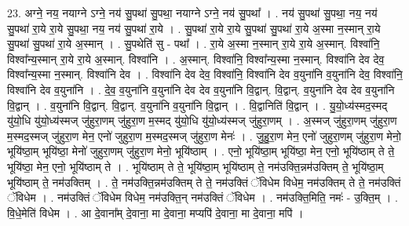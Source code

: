 \documentclass[17pt]{extarticle}
\begin{document}
23. अग्ने॒ नय॒ नयाग्ने ऽग्ने॒ नय॑ सु॒पथा॑ सु॒पथा॒ नयाग्ने ऽग्ने॒ नय॑ सु॒पथा᳚ । . नय॑ सु॒पथा॑ सु॒पथा॒ नय॒ नय॑ सु॒पथा॑ रा॒ये रा॒ये सु॒पथा॒ नय॒ नय॑ सु॒पथा॑ रा॒ये । . सु॒पथा॑ रा॒ये रा॒ये सु॒पथा॑ सु॒पथा॑ रा॒ये अ॒स्मा न॒स्मान् रा॒ये सु॒पथा॑ सु॒पथा॑ रा॒ये अ॒स्मान् । . सु॒पथेति॑ सु - पथा᳚ । . रा॒ये अ॒स्मा न॒स्मान् रा॒ये रा॒ये अ॒स्मान्. विश्वा॑नि॒ विश्वा᳚न्य॒स्मान् रा॒ये रा॒ये अ॒स्मान्. विश्वा॑नि । . अ॒स्मान्. विश्वा॑नि॒ विश्वा᳚न्य॒स्मा न॒स्मान्. विश्वा॑नि देव देव॒ विश्वा᳚न्य॒स्मा न॒स्मान्. विश्वा॑नि देव । . विश्वा॑नि देव देव॒ विश्वा॑नि॒ विश्वा॑नि देव व॒युना॑नि व॒युना॑नि देव॒ विश्वा॑नि॒ विश्वा॑नि देव व॒युना॑नि । . दे॒व॒ व॒युना॑नि व॒युना॑नि देव देव व॒युना॑नि वि॒द्वान्. वि॒द्वान्. व॒युना॑नि देव देव व॒युना॑नि वि॒द्वान् । . व॒युना॑नि वि॒द्वान्. वि॒द्वान्. व॒युना॑नि व॒युना॑नि वि॒द्वान् । . वि॒द्वानिति॑ वि॒द्वान् । . यु॒यो॒ध्य॑स्मद॒स्मद् यु॑यो॒धि यु॑यो॒ध्य॑स्मज् जु॑हुरा॒णम् जु॑हुरा॒ण म॒स्मद् यु॑यो॒धि यु॑यो॒ध्य॑स्मज् जु॑हुरा॒णम् । . अ॒स्मज् जु॑हुरा॒णम् जु॑हुरा॒ण म॒स्मद॒स्मज् जु॑हुरा॒ण मेन॒ एनो॑ जुहुरा॒ण म॒स्मद॒स्मज् जु॑हुरा॒ण मेनः॑ । . जु॒हु॒रा॒ण मेन॒ एनो॑ जुहुरा॒णम् जु॑हुरा॒ण मेनो॒ भूयि॑ष्ठा॒म् भूयि॑ष्ठा॒ मेनो॑ जुहुरा॒णम् जु॑हुरा॒ण मेनो॒ भूयि॑ष्ठाम् । . एनो॒ भूयि॑ष्ठा॒म् भूयि॑ष्ठा॒ मेन॒ एनो॒ भूयि॑ष्ठाम् ते ते॒ भूयि॑ष्ठा॒ मेन॒ एनो॒ भूयि॑ष्ठाम् ते । . भूयि॑ष्ठाम् ते ते॒ भूयि॑ष्ठा॒म् भूयि॑ष्ठाम् ते॒ नम॑उक्ति॒न्नम॑उक्तिम् ते॒ भूयि॑ष्ठा॒म् भूयि॑ष्ठाम् ते॒ नम॑उक्तिम् । . ते॒ नम॑उक्ति॒न्नम॑उक्तिम् ते ते॒ नम॑उक्तिं ॅविधेम विधेम॒ नम॑उक्तिम् ते ते॒ नम॑उक्तिं ॅविधेम । . नम॑उक्तिं ॅविधेम विधेम॒ नम॑उक्ति॒न् नम॑उक्तिं ॅविधेम । . नम॑उक्ति॒मिति॒ नमः॑ - उ॒क्ति॒म् । . वि॒धे॒मेति॑ विधेम । . आ दे॒वाना᳚म् दे॒वाना॒ मा दे॒वाना॒ मप्यपि॑ दे॒वाना॒ मा दे॒वाना॒ मपि॑ । \newline
\end{document}
